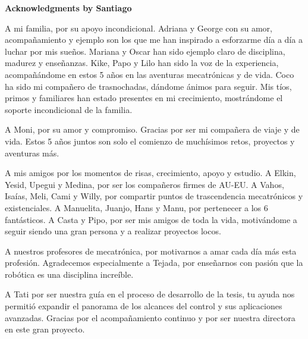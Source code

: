 \documentclass[11pt]{report} %
\begin{document}
\begin{titlepage}
\begin{center}

\begin{Large}

\vspace*{0.3cm}
\textbf{Acknowledgments by Santiago}\\
\vspace*{0.2cm}

A mi familia, por su apoyo incondicional. Adriana y George con su amor, acompañamiento y ejemplo son los que me han inspirado a esforzarme día a día a luchar por mis sueños. Mariana y Oscar han sido ejemplo claro de disciplina, madurez y enseñanzas. Kike, Papo y Lilo han sido la voz de la experiencia, acompañándome en estos 5 años en las aventuras mecatrónicas y de vida. Coco ha sido mi compañero de trasnochadas, dándome ánimos para seguir. Mis tíos, primos y familiares han estado presentes en mi crecimiento, mostrándome el soporte incondicional de la familia.\\

\vspace*{0.4cm}

A Moni, por su amor y compromiso. Gracias por ser mi compañera de viaje y de vida. Estos 5 años juntos son solo el comienzo de muchísimos retos, proyectos y aventuras más.\\

\vspace*{0.4cm}

A mis amigos por los momentos de risas, crecimiento, apoyo y estudio. A Elkin, Yesid, Upegui y Medina, por ser los compañeros firmes de AU-EU. A Vahos, Isaías, Meli, Cami y Willy, por compartir puntos de trascendencia mecatrónicos y existenciales. A Manuelita, Juanjo, Hans y Manu, por pertenecer a los 6 fantásticos. A Casta y Pipo, por ser mis amigos de toda la vida, motivándome a seguir siendo una gran persona y a realizar proyectos locos.\\

\vspace*{0.4cm}

A nuestros profesores de mecatrónica, por motivarnos a amar cada día más esta profesión. Agradecemos especialmente a Tejada, por enseñarnos con pasión que la robótica es una disciplina increíble.\\

\vspace*{0.4cm}

A Tati por ser nuestra guía en el proceso de desarrollo de la tesis, tu ayuda nos permitió expandir el panorama de los alcances del control y sus aplicaciones avanzadas. Gracias por el acompañamiento continuo y por ser nuestra directora en este gran proyecto.\\



\end{Large}
\end{center}
\end{titlepage}
\end{document}
